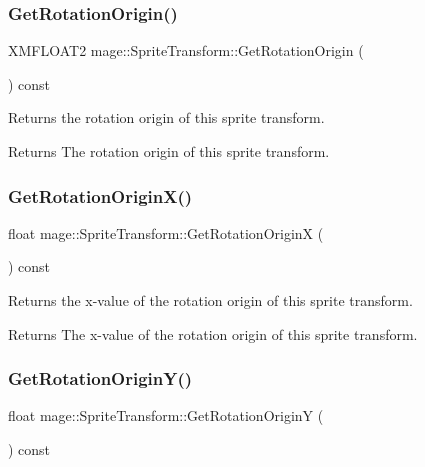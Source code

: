 \subsubsection{\texorpdfstring{Get\+Rotation\+Origin()}{GetRotationOrigin()}}
{\footnotesize\ttfamily X\+M\+F\+L\+O\+A\+T2 mage\+::\+Sprite\+Transform\+::\+Get\+Rotation\+Origin (\begin{DoxyParamCaption}{ }\end{DoxyParamCaption}) const}

Returns the rotation origin of this sprite transform.

\begin{DoxyReturn}{Returns}
The rotation origin of this sprite transform. 
\end{DoxyReturn}
\hypertarget{structmage_1_1_sprite_transform_abf3a72d9f594aa157608070d69f4428e}{}\label{structmage_1_1_sprite_transform_abf3a72d9f594aa157608070d69f4428e} 
\subsubsection{\texorpdfstring{Get\+Rotation\+Origin\+X()}{GetRotationOriginX()}}
{\footnotesize\ttfamily float mage\+::\+Sprite\+Transform\+::\+Get\+Rotation\+OriginX (\begin{DoxyParamCaption}{ }\end{DoxyParamCaption}) const}

Returns the x-\/value of the rotation origin of this sprite transform.

\begin{DoxyReturn}{Returns}
The x-\/value of the rotation origin of this sprite transform. 
\end{DoxyReturn}
\hypertarget{structmage_1_1_sprite_transform_a0f6056a96c419817211efce6687e1d89}{}\label{structmage_1_1_sprite_transform_a0f6056a96c419817211efce6687e1d89} 
\subsubsection{\texorpdfstring{Get\+Rotation\+Origin\+Y()}{GetRotationOriginY()}}
{\footnotesize\ttfamily float mage\+::\+Sprite\+Transform\+::\+Get\+Rotation\+OriginY (\begin{DoxyParamCaption}{ }\end{DoxyParamCaption}) const}

